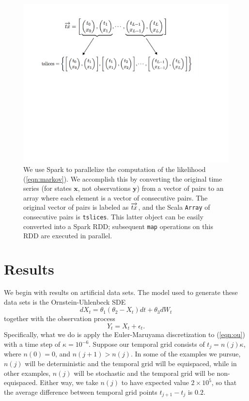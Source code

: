 \documentclass[wcp]{jmlr}
\begin{document}
\begin{figure}[ht]
\begin{center}
\includegraphics[width=6in]{vec_to_slice}
\end{center}
\vspace{-0.5in}
\caption{We use Spark to parallelize the computation of the likelihood
(\ref{eqn:markov}).  We accomplish this by converting the
original time series (for states $\mathbf{x}$, not observations
$\mathbf{y}$) from a vector of pairs to an array where each element is
a vector of consecutive pairs.  The original vector of pairs is
labeled as $\protect\overrightarrow{tx}$, and the Scala \texttt{Array}
of consecutive pairs is \texttt{tslices}.  This latter object can be
easily converted into a Spark RDD; subsequent \texttt{map} operations
on this RDD are executed in parallel.}
\label{fig:implementation2}
\end{figure}

\section{Results}
\label{sect:results}
We begin with results on artificial data sets.  The model used to
generate these data sets is the Ornstein-Uhlenbeck SDE
\begin{equation}
\label{eqn:ou}
{d}X_t = \theta_1 (\theta_2 - X_t) {d}t + \theta_3 {d}W_t
\end{equation}
together with the observation process
\begin{equation}
\label{eqn:ou_obs}
Y_t = X_t + \epsilon_t.
\end{equation}
Specifically, what we do is apply the Euler-Maruyama discretization to
(\ref{eqn:ou}) with a time step of $\kappa = 10^{-6}$.  Suppose our
temporal grid consists of $t_j = n(j) \kappa$, where $n(0) = 0$,
and $n(j+1) > n(j)$.  In some of the examples we pursue, $n(j)$ will
be deterministic and the temporal grid will be equispaced, while in other examples, $n(j)$ will
be stochastic and the temporal grid will be non-equispaced.  Either
way, we take $n(j)$ to have expected value $2 \times 10^5$, so that
the average difference between temporal grid points $t_{j+1} - t_j$ is $0.2$.
\end{document}
